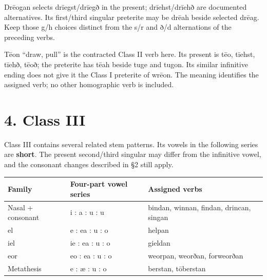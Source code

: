 Drēogan selects drīegst/\allowbreak{}drīegð in the present; drīehst/\allowbreak{}drīehð are documented alternatives. Its first/\allowbreak{}third singular preterite may be drēah beside selected drēag. Keep those g/\allowbreak{}h choices distinct from the s/\allowbreak{}r and ð/\allowbreak{}d alternations of the preceding verbs.

Tēon “draw, pull” is the contracted Class II verb here. Its present is tēo, tīehst, tīehð, tēoð; the preterite has tēah beside tuge and tugon. Its similar infinitive ending does not give it the Class I preterite of wrēon. The meaning identifies the assigned verb; no other homographic verb is included.

\section*{4. Class III}

Class III contains several related stem patterns. Its vowels in the following series are \textbf{short}. The present second/\allowbreak{}third singular may differ from the infinitive vowel, and the consonant changes described in §2 still apply.

\par\begingroup
\fontsize{10.5}{13.2}\selectfont
\setlength{\LTleft}{0pt}\setlength{\LTright}{\fill}
\noindent
\begin{tabular}{@{}>{\raggedright\arraybackslash}p{30.49mm}>{\raggedright\arraybackslash}p{34.43mm}>{\raggedright\arraybackslash}p{53.45mm}@{}}
\toprule
\textbf{Family} & \textbf{Four-part vowel series} & \textbf{Assigned verbs} \\
\midrule
Nasal + consonant & i : a : u : u & bindan, winnan, findan, drincan, singan \\
el & e : ea : u : o & helpan \\
iel & ie : ea : u : o & gieldan \\
eor & eo : ea : u : o & weorpan, weorðan, forweorðan \\
Metathesis & e : æ : u : o & berstan, tōberstan \\
\bottomrule
\end{tabular}
\par\endgroup

